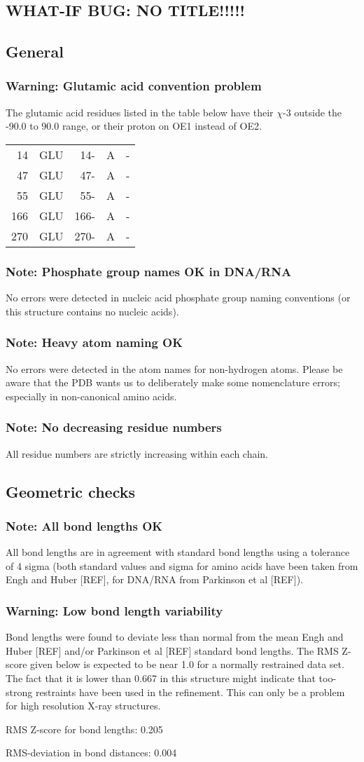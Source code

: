 \documentclass[a4paper]{article}
\def\showsect#1{
  \thesect\gdef\thesect{}
  \thessect\gdef\thessect{}
  \subsubsection{#1}
}
\def\ssect#1{
  \gdef\thessect{\subsection{#1}}
}
\gdef\thesect{\pagebreak[2]\section{WHAT-IF BUG: NO TITLE!!!!!}}
\gdef\thessect{\subsection{General}}
\begin{document}
\begin{warning}
\showsect{Warning: Glutamic acid convention problem}
The glutamic acid residues listed in the table below have their $\chi$-3
outside the -90.0 to 90.0 range, or their proton on OE1 instead of OE2.
 
\begin{center}
 
\begin{supertabular}{rr@{ (}r@{) }rl}
   14&GLU &  14-&A &-\\
   47&GLU &  47-&A &-\\
   55&GLU &  55-&A &-\\
  166&GLU & 166-&A &-\\
  270&GLU & 270-&A &-\\
\end{supertabular}\end{center}
\end{warning}

\begin{note}
\showsect{Note: Phosphate group names OK in DNA/RNA}
No errors were detected in nucleic acid phosphate group naming conventions
(or this structure contains no nucleic acids).
\end{note}

\begin{note}
\showsect{Note: Heavy atom naming OK}
No errors were detected in the atom names for non-hydrogen atoms. Please
be aware that the PDB wants us to deliberately make some nomenclature errors;
especially in non-canonical amino acids.
\end{note}

\begin{note}
\showsect{Note: No decreasing residue numbers}
All residue numbers are strictly increasing within each chain.
\end{note}

\ssect{Geometric checks}
\begin{note}
\showsect{Note: All bond lengths OK}
All bond lengths are in agreement with standard bond lengths using a
tolerance of 4 sigma (both standard values and sigma for amino acids
have been taken from Engh and Huber [REF], for DNA/RNA from Parkinson
et al [REF]).
\end{note}

\begin{warning}
\showsect{Warning: Low bond length variability}
Bond lengths were found to deviate less than normal from the mean Engh and
Huber [REF] and/or Parkinson et al [REF] standard bond lengths. The RMS
Z-score given below is expected to be near 1.0 for a normally restrained
data set. The fact that it is lower than 0.667 in this structure might
indicate that too-strong restraints have been used in the refinement. This
can only be a problem  for high resolution X-ray structures.
 
\parbox{1\textwidth}{
 RMS Z-score for bond lengths: 0.205
 
 RMS-deviation in bond distances: 0.004
}%
 
\end{warning}
\end{document}

